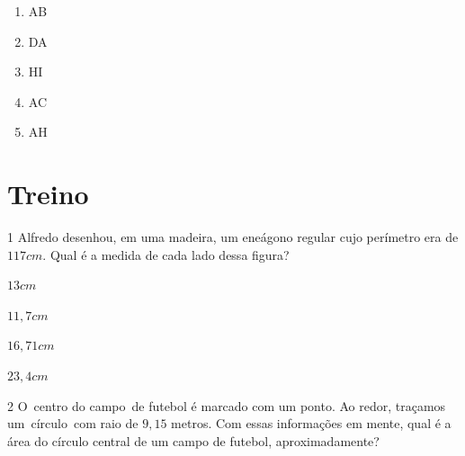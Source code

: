 {{\begin{enumerate}
\item AB

\item DA

\item HI

\item AC

\item AH

\end{enumerate}

\pagebreak

\section*{Treino}

\num{1} Alfredo desenhou, em uma madeira, um eneágono regular cujo perímetro
era de $117 cm$. Qual é a medida de cada lado dessa figura?


\begin{escolha}
\item $13 cm$ 
\item $11,7 cm$
\item $16,71 cm$
\item $23,4 cm$
\end{escolha}







\num{2} O~centro do campo~de futebol é marcado com um ponto. Ao redor,
traçamos um~círculo~com raio de $9,15$ metros. Com essas informações em
mente, qual é a área do círculo central de um campo de futebol,
aproximadamente?

}}
